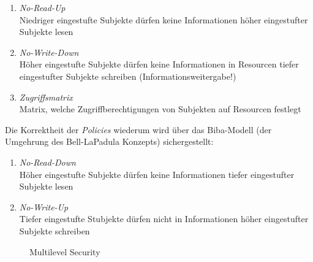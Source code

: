 \begin{enumerate}
	\item \emph{No-Read-Up}\\
	Niedriger eingestufte Subjekte dürfen keine Informationen höher eingestufter Subjekte lesen
	\item \emph{No-Write-Down}\\
	Höher eingestufte Subjekte dürfen keine Informationen in Resourcen tiefer eingestufter Subjekte schreiben (Informationsweitergabe!)
	\item \emph{Zugriffsmatrix}\\
	Matrix, welche Zugriffberechtigungen von Subjekten auf Resourcen festlegt
\end{enumerate}


Die Korrektheit der \emph{Policies} wiederum wird über das Biba-Modell\cite{Biba} (der Umgehrung des Bell-LaPadula Konzepts) sichergestellt:

\begin{enumerate}
	\item \emph{No-Read-Down}\\
	Höher eingestufte Subjekte dürfen keine Informationen tiefer eingestufter Subjekte lesen
	\item \emph{No-Write-Up}\\
	Tiefer eingestufte Stubjekte dürfen nicht in Informationen höher eingestufter Subjekte schreiben
\end{enumerate}


\begin{figure}[H]
	\begin{center}
	\end{center}
\caption{Multilevel Security}
\end{figure}

